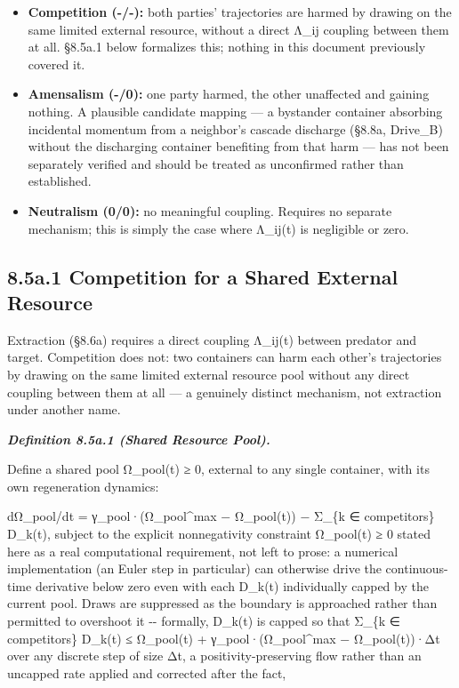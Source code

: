 \documentclass[
]{article}
\begin{document}
\begin{itemize}
\item
  \textbf{Competition (-/-):} both parties' trajectories are harmed by
  drawing on the same limited external resource, without a direct Λ\_ij
  coupling between them at all. §8.5a.1 below formalizes this; nothing
  in this document previously covered it.
\item
  \textbf{Amensalism (-/0):} one party harmed, the other unaffected and
  gaining nothing. A plausible candidate mapping --- a bystander
  container absorbing incidental momentum from a neighbor's cascade
  discharge (§8.8a, Drive\_B) without the discharging container
  benefiting from that harm --- has not been separately verified and
  should be treated as unconfirmed rather than established.
\item
  \textbf{Neutralism (0/0):} no meaningful coupling. Requires no
  separate mechanism; this is simply the case where Λ\_ij(t) is
  negligible or zero.
\end{itemize}

\hypertarget{a.1-competition-for-a-shared-external-resource}{%
\subsection{8.5a.1 Competition for a Shared External
Resource}\label{a.1-competition-for-a-shared-external-resource}}

Extraction (§8.6a) requires a direct coupling Λ\_ij(t) between predator
and target. Competition does not: two containers can harm each other's
trajectories by drawing on the same limited external resource pool
without any direct coupling between them at all --- a genuinely distinct
mechanism, not extraction under another name.

\emph{\textbf{Definition 8.5a.1 (Shared Resource Pool).}}

Define a shared pool Ω\_pool(t) ≥ 0, external to any single container,
with its own regeneration dynamics:

dΩ\_pool/dt = γ\_pool·(Ω\_pool\^{}max − Ω\_pool(t)) − Σ\_\{k ∈
competitors\} D\_k(t), subject to the explicit nonnegativity constraint
Ω\_pool(t) ≥ 0 stated here as a real computational requirement, not left
to prose: a numerical implementation (an Euler step in particular) can
otherwise drive the continuous-time derivative below zero even with each
D\_k(t) individually capped by the current pool. Draws are suppressed as
the boundary is approached rather than permitted to overshoot it -\/-
formally, D\_k(t) is capped so that Σ\_\{k ∈ competitors\} D\_k(t) ≤
Ω\_pool(t) + γ\_pool·(Ω\_pool\^{}max − Ω\_pool(t))·Δt over any discrete
step of size Δt, a positivity-preserving flow rather than an uncapped
rate applied and corrected after the fact,
\end{document}

